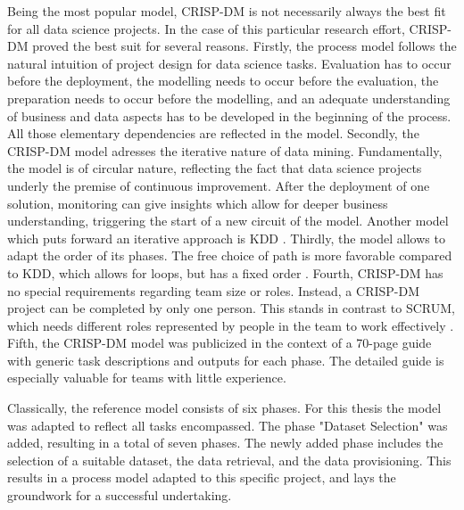 Being the most popular model, \ac{CRISP-DM} is not necessarily always the best fit for all data science projects. In the case of this particular research effort, \ac{CRISP-DM} proved the best suit for several reasons.
Firstly, the process model follows the natural intuition of project design for data science tasks. Evaluation has to occur before the deployment, the modelling needs to occur before the evaluation, the preparation needs to occur before the modelling, and an adequate understanding of business and data aspects has to be developed in the beginning of the process. All those elementary dependencies are reflected in the model.
Secondly, the \ac{CRISP-DM} model adresses the iterative nature of data mining. Fundamentally, the model is of circular nature, reflecting the fact that data science projects underly the premise of continuous improvement. After the deployment of one solution, monitoring can give insights which allow for deeper business understanding, triggering the start of a new circuit of the model. Another model which puts forward an iterative approach is \ac{KDD} \cite{KDD}.
Thirdly, the model allows to adapt the order of its phases. The free choice of path is more favorable compared to \ac{KDD}, which allows for loops, but has a fixed order \cite{KDD}.
Fourth, \ac{CRISP-DM} has no special requirements regarding team size or roles. Instead, a \ac{CRISP-DM} project can be completed by only one person. This stands in contrast to SCRUM, which needs different roles represented by people in the team to work effectively \cite{SCRUMSolo}. 
Fifth, the \ac{CRISP-DM} model was publicized in the context of a 70-page guide with generic task descriptions and outputs for each phase. The detailed guide is especially valuable for teams with little experience.

Classically, the reference model consists of six phases. For this thesis the model was adapted to reflect all tasks encompassed. The phase "Dataset Selection" was added, resulting in a total of seven phases. The newly added phase includes the selection of a suitable dataset, the data retrieval, and the data provisioning. This results in a process model adapted to this specific project, and lays the groundwork for a successful undertaking.

 